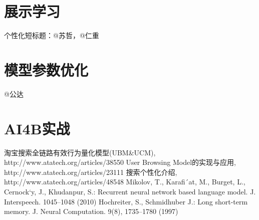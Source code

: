 \subsection{}

\section{展示学习}
	个性化短标题：@苏哲，@仁重 

\section{模型参数优化} 
	@公达

\section{AI4B实战} 

\begin{thebibliography}{99}
 淘宝搜索全链路有效行为量化模型(UBM\&UCM), http://www.atatech.org/articles/38550
 User Browsing Model的实现与应用, http://www.atatech.org/articles/23111
 搜索个性化介绍, http://www.atatech.org/articles/48548
 Mikolov, T., Karafi´at, M., Burget, L., Cernock`y, J., Khudanpur, S.: Recurrent neural network based language model. J. Interspeech. 1045–1048 (2010)
  Hochreiter, S., Schmidhuber J.: Long short-term memory. J. Neural Computation. 9(8), 1735–1780 (1997)
\end{thebibliography}

 
